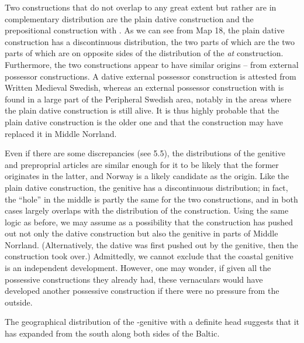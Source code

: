Two constructions that do not overlap to any great extent but rather are in complementary distribution are the plain dative construction and the prepositional construction with . As we can see from Map 18, the plain dative construction has a discontinuous distribution, the two parts of which are the two parts of which are on opposite sides of the distribution of the \textit{at} construction. Furthermore, the two constructions appear to have similar origins – from external possessor constructions. A dative external possessor construction is attested from Written Medieval Swedish, whereas an external possessor construction with  is found in a large part of the Peripheral Swedish area, notably in the areas where the plain dative construction is still alive. It is thus highly probable that the plain dative construction is the older one and that the  construction may have replaced it in Middle Norrland. 


Even if there are some discrepancies (see 5.5), the distributions of the genitive and preproprial articles are similar enough for it to be likely that the former originates in the latter, and Norway is a likely candidate as the origin. Like the plain dative construction, the genitive has a discontinuous distribution; in fact, the “hole” in the middle is partly the same for the two constructions, and in both cases largely overlaps with the distribution of the  construction. Using the same logic as before, we may assume as a possibility that the  construction has pushed out not only the dative construction but also the genitive in parts of Middle Norrland. (Alternatively, the dative was first pushed out by the genitive, then the construction took over.) Admittedly, we cannot exclude that the coastal genitive is an independent development. However, one may wonder, if given all the possessive constructions they already had, these vernaculars would have developed another possessive construction if there were no pressure from the outside.


The geographical distribution of the -genitive with a definite head suggests that it has expanded from the south along both sides of the Baltic. 

